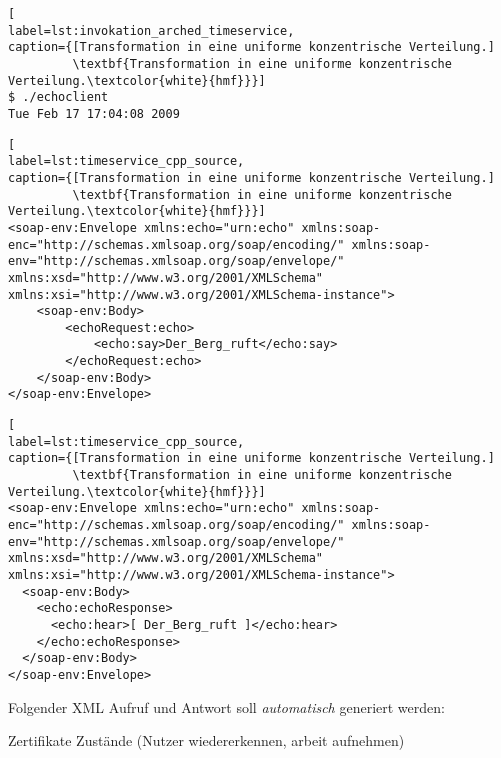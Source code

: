 \begin{minipage}[t]{\textwidth}
\begin{lstlisting}[
label=lst:invokation_arched_timeservice,
caption={[Transformation in eine uniforme konzentrische Verteilung.]
         \textbf{Transformation in eine uniforme konzentrische Verteilung.\textcolor{white}{hmf}}}]
$ ./echoclient
Tue Feb 17 17:04:08 2009
\end{lstlisting}
\end{minipage}





\begin{minipage}[t]{\textwidth}
\begin{lstlisting}[
label=lst:timeservice_cpp_source,
caption={[Transformation in eine uniforme konzentrische Verteilung.]
         \textbf{Transformation in eine uniforme konzentrische Verteilung.\textcolor{white}{hmf}}}]
<soap-env:Envelope xmlns:echo="urn:echo" xmlns:soap-enc="http://schemas.xmlsoap.org/soap/encoding/" xmlns:soap-env="http://schemas.xmlsoap.org/soap/envelope/" xmlns:xsd="http://www.w3.org/2001/XMLSchema" xmlns:xsi="http://www.w3.org/2001/XMLSchema-instance">
	<soap-env:Body>
		<echoRequest:echo>
			<echo:say>Der_Berg_ruft</echo:say>
		</echoRequest:echo>
	</soap-env:Body>
</soap-env:Envelope>
\end{lstlisting}
\end{minipage}


\begin{minipage}[t]{\textwidth}
\begin{lstlisting}[
label=lst:timeservice_cpp_source,
caption={[Transformation in eine uniforme konzentrische Verteilung.]
         \textbf{Transformation in eine uniforme konzentrische Verteilung.\textcolor{white}{hmf}}}]
<soap-env:Envelope xmlns:echo="urn:echo" xmlns:soap-enc="http://schemas.xmlsoap.org/soap/encoding/" xmlns:soap-env="http://schemas.xmlsoap.org/soap/envelope/" xmlns:xsd="http://www.w3.org/2001/XMLSchema" xmlns:xsi="http://www.w3.org/2001/XMLSchema-instance">
  <soap-env:Body>
    <echo:echoResponse>
      <echo:hear>[ Der_Berg_ruft ]</echo:hear>
    </echo:echoResponse>
  </soap-env:Body>
</soap-env:Envelope>
\end{lstlisting}
\end{minipage}








Folgender XML Aufruf und Antwort soll \textit{automatisch} generiert werden:






Zertifikate
Zustände (Nutzer wiedererkennen, arbeit aufnehmen)

